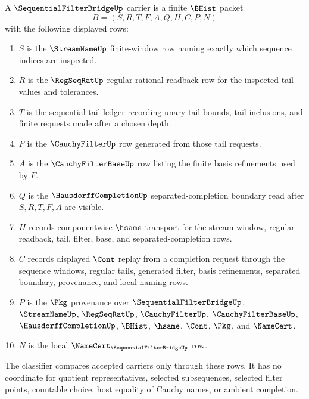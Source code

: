 \begin{definition}
\label{def:sequential-filter-bridge-carrier}
A $\SequentialFilterBridgeUp$ carrier is a finite $\BHist$ packet
$$
B=(S,R,T,F,A,Q,H,C,P,N)
$$
with the following displayed rows:
\begin{enumerate}
\item $S$ is the $\StreamNameUp$ finite-window row naming exactly which sequence indices are inspected.
\item $R$ is the $\RegSeqRatUp$ regular-rational readback row for the inspected tail values and tolerances.
\item $T$ is the sequential tail ledger recording unary tail bounds, tail inclusions, and finite requests made after a chosen depth.
\item $F$ is the $\CauchyFilterUp$ row generated from those tail requests.
\item $A$ is the $\CauchyFilterBaseUp$ row listing the finite basis refinements used by $F$.
\item $Q$ is the $\HausdorffCompletionUp$ separated-completion boundary read after $S,R,T,F,A$ are visible.
\item $H$ records componentwise $\hsame$ transport for the stream-window, regular-readback, tail, filter, base, and separated-completion rows.
\item $C$ records displayed $\Cont$ replay from a completion request through the sequence windows, regular tails, generated filter, basis refinements, separated boundary, provenance, and local naming rows.
\item $P$ is the $\Pkg$ provenance over $\SequentialFilterBridgeUp$, $\StreamNameUp$, $\RegSeqRatUp$, $\CauchyFilterUp$, $\CauchyFilterBaseUp$, $\HausdorffCompletionUp$, $\BHist$, $\hsame$, $\Cont$, $\Pkg$, and $\NameCert$.
\item $N$ is the local $\NameCert_{\SequentialFilterBridgeUp}$ row.
\end{enumerate}
The classifier compares accepted carriers only through these rows. It has no coordinate for quotient representatives, selected subsequences, selected filter points, countable choice, host equality of Cauchy names, or ambient completion.
\end{definition}

